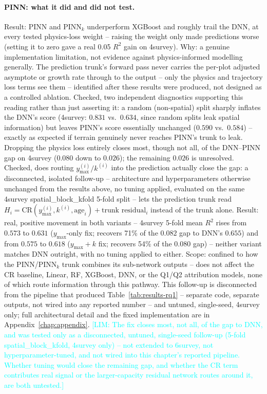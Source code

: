 \documentclass[logo,msc,ai]{infthesis}           %
\newcommand{\limit}[1]{\textcolor{cyan}{[LIM: #1]}}
\begin{document}
\paragraph*{PINN: what it did and did not test.}
\label{sec:rq1-pinn-limitation}
Result: PINN and PINN$_k$ underperform XGBoost and roughly trail the DNN, at
every tested physics-loss weight -- raising the weight only made predictions
worse (setting it to zero gave a real 0.05 $R^2$ gain on 4survey).
Why: a genuine implementation limitation, not evidence against physics-informed
modelling generally. The prediction trunk's forward pass never carries the
per-plot adjusted asymptote or growth rate through to the output -- only the
physics and trajectory loss terms see them -- identified after these results
were produced, not designed as a controlled ablation.
Checked, two independent diagnostics supporting this reading rather than just
asserting it: a random (non-spatial) split sharply inflates the DNN's score
(4survey: $0.831$ vs.\ $0.634$, since random splits leak spatial information)
but leaves PINN's score essentially unchanged ($0.590$ vs.\ $0.584$) -- exactly
as expected if terrain genuinely never reaches PINN's trunk to leak. Dropping
the physics loss entirely closes most, though not all, of the DNN--PINN gap on
4survey ($0.080$ down to $0.026$); the remaining $0.026$ is unresolved.
Checked, does routing $y_{\max}^{(i)}/k^{(i)}$ into the prediction actually
close the gap: a disconnected, isolated follow-up -- architecture and
hyperparameters otherwise unchanged from the results above, no tuning
applied, evaluated on the same 4survey spatial\_block\_kfold 5-fold split --
lets the prediction trunk read $H_i = \text{CR}(y_{\max}^{(i)}, k^{(i)},
\text{age}_i) + \text{trunk residual}_i$ instead of the trunk alone. Result:
real, positive movement in both variants -- 4survey 5-fold mean $R^2$ rises
from $0.573$ to $0.631$ ($y_{\max}$-only fix; recovers 71\% of the $0.082$
gap to DNN's $0.655$) and from $0.575$ to $0.618$ ($y_{\max}{+}k$ fix;
recovers 54\% of the $0.080$ gap) -- neither variant matches DNN outright,
with no tuning applied to either.
Scope: confined to how the PINN/PINN$_k$ trunk combines its sub-network
outputs -- does not affect the CR baseline, Linear, RF, XGBoost, DNN, or the
Q1/Q2 attribution models, none of which route information through this
pathway. This follow-up is disconnected from the pipeline that produced
Table~\ref{tab:results-rq1} -- separate code, separate outputs, not wired
into any reported number -- and untuned, single-seed, 4survey only; full
architectural detail and the fixed implementation are in
Appendix~\ref{chap:appendix}.
\limit{The fix closes most, not all, of the gap to DNN, and was tested only
as a disconnected, untuned, single-seed follow-up (5-fold
spatial\_block\_kfold, 4survey only) -- not extended to 6survey, not
hyperparameter-tuned, and not wired into this chapter's reported pipeline.
Whether tuning would close the remaining gap, and whether the CR term
contributes real signal or the larger-capacity residual network routes
around it, are both untested.}
\end{document}
